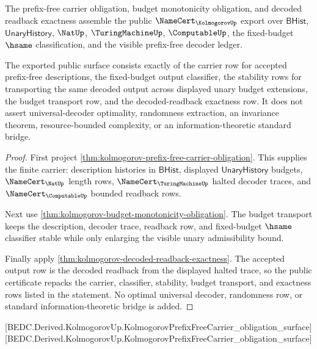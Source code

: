 \begin{theorem}
\label{thm:kolmogorov-public-namecert-export}
The prefix-free carrier obligation, budget monotonicity obligation, and
decoded readback exactness assemble the public
$\NameCert_{\KolmogorovUp}$ export over $\mathsf{BHist}$,
$\mathsf{UnaryHistory}$, $\NatUp$, $\TuringMachineUp$, $\ComputableUp$, the
fixed-budget $\hsame$ classification, and the visible prefix-free decoder
ledger.

The exported public surface consists exactly of the carrier row for accepted
prefix-free descriptions, the fixed-budget output classifier, the stability
rows for transporting the same decoded output across displayed unary budget
extensions, the budget transport row, and the decoded-readback exactness row.
It does not assert universal-decoder optimality, randomness extraction, an
invariance theorem, resource-bounded complexity, or an information-theoretic
standard bridge.
\end{theorem}
\begin{proof}
First project
\autoref{thm:kolmogorov-prefix-free-carrier-obligation}. This supplies the
finite carrier: description histories in $\mathsf{BHist}$, displayed
$\mathsf{UnaryHistory}$ budgets, $\NameCert_{\NatUp}$ length rows,
$\NameCert_{\TuringMachineUp}$ halted decoder traces, and
$\NameCert_{\ComputableUp}$ bounded readback rows.

Next use \autoref{thm:kolmogorov-budget-monotonicity-obligation}. The budget
transport keeps the description, decoder trace, readback row, and
fixed-budget $\hsame$ classifier stable while only enlarging the visible unary
admissibility bound.

Finally apply \autoref{thm:kolmogorov-decoded-readback-exactness}. The
accepted output row is the decoded readback from the displayed halted trace,
so the public certificate repacks the carrier, classifier, stability, budget
transport, and exactness rows listed in the statement. No optimal universal
decoder, randomness row, or standard information-theoretic bridge is added.
\end{proof}

[BEDC.Derived.KolmogorovUp.KolmogorovPrefixFreeCarrier\_obligation\_surface]
[BEDC.Derived.KolmogorovUp.KolmogorovPrefixFreeCarrier\_obligation\_surface]

